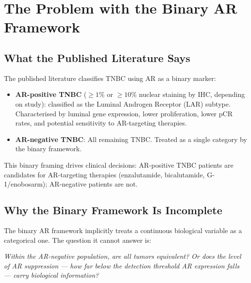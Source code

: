 \documentclass[12pt, a4paper]{article}
\begin{document}
\section{The Problem with the Binary AR Framework}

\subsection{What the Published Literature Says}

The published literature classifies TNBC using
AR as a binary marker:

\begin{itemize}
    \item \textbf{AR-positive TNBC}
    ($\geq 1\%$ or $\geq 10\%$ nuclear staining
    by IHC, depending on study): classified as
    the Luminal Androgen Receptor (LAR) subtype.
    Characterised by luminal gene expression,
    lower proliferation, lower pCR rates,
    and potential sensitivity to AR-targeting
    therapies.

    \item \textbf{AR-negative TNBC}: All
    remaining TNBC. Treated as a single category
    by the binary framework.
\end{itemize}

This binary framing drives clinical decisions:
AR-positive TNBC patients are candidates for
AR-targeting therapies (enzalutamide,
bicalutamide, G-1/enobosarm); AR-negative
patients are not.

\subsection{Why the Binary Framework Is Incomplete}

The binary AR framework implicitly treats a
continuous biological variable as a categorical
one. The question it cannot answer is:

\begin{center}
\colorbox{contrastbox}{
\begin{minipage}{0.82\textwidth}
\vspace{0.4em}
\textit{Within the AR-negative population, are
all tumors equivalent? Or does the level of AR
suppression --- how far below the detection
threshold AR expression falls --- carry
biological information?}
\vspace{0.4em}
\end{minipage}}
\end{center}
\end{document}
